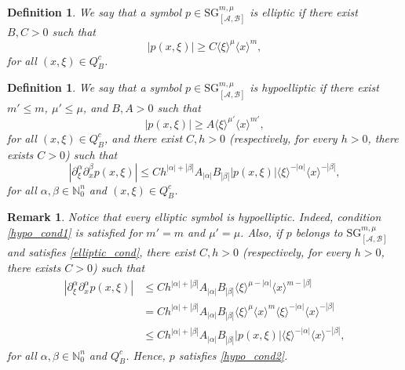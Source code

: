 \documentclass[11pt,reqno]{amsart}
\numberwithin{equation}{section}
\newtheorem{definition}[theorem]{Definition}
\newtheorem{remark}[theorem]{Remark}
\newcommand{\N}{{\mathbb{N}}} %
\newcommand{\SG}{{\mathrm{SG}}}
\newcommand{\A}{{\mathcal{A}}} %
\newcommand{\B}{{\mathcal{B}}} %
\begin{document}
\begin{definition}\label{def_elliptic}
	We say that a symbol $p\in {\SG}_{[\A,\B]}^{m,\mu}$ is elliptic if there exist $B,C>0$ such that
	\begin{equation}\label{elliptic_cond}
		|p(x,\xi)|\geq C\langle\xi\rangle^{\mu}\langle x\rangle^{m},
	\end{equation}
	for all $(x,\xi)\in Q_B^c$.
\end{definition}



\begin{definition}\label{def_hypo}
	We say that a symbol $p\in {\SG}_{[\A,\B]}^{m,\mu}$ is hypoelliptic if there exist $m'\leq m$, $\mu'\leq \mu$, and $B,A>0$ such that
	\begin{equation}\label{hypo_cond1}
		|p(x,\xi)| \geq A\langle\xi\rangle^{\mu'}\langle x\rangle^{m'},
	\end{equation}
	for all $(x,\xi)\in Q_B^c$, and there exist $C,h>0$ (respectively, for every $h>0$, there exists $C>0$) such that
	\begin{equation}\label{hypo_cond2}
		|\partial_\xi^\alpha\partial_x^\beta p(x,\xi)| \leq Ch^{|\alpha|+|\beta|}A_{|\alpha|}B_{|\beta|}|p(x,\xi)|\langle\xi\rangle^{-|\alpha|}\langle x\rangle^{-|\beta|},
	\end{equation}
	for all $\alpha,\beta\in\N_0^n$ and $(x,\xi)\in Q_B^c$.
\end{definition}



\begin{remark}
	Notice that every elliptic symbol is hypoelliptic. Indeed, condition \eqref{hypo_cond1} is satisfied for $m'=m$ and $\mu'=\mu$. 
	Also, if $p$ belongs to ${\SG}_{[\A,\B]}^{m,\mu}$ and satisfies \eqref{elliptic_cond}, there exist $C,h>0$ 
	(respectively, for every $h>0$, there exists $C>0$) such that
	\begin{align*}
		|\partial_\xi^\alpha\partial_x^\alpha p(x,\xi)| & \leq Ch^{|\alpha|+|\beta|}A_{|\alpha|}B_{|\beta|}\langle\xi\rangle^{\mu-|\alpha|}\langle x\rangle^{m-|\beta|}\\
		& = Ch^{|\alpha|+|\beta|}A_{|\alpha|}B_{|\beta|}\langle\xi\rangle^{\mu}\langle x\rangle^{m}\langle\xi\rangle^{-|\alpha|}\langle x\rangle^{-|\beta|}\\
		& \leq Ch^{|\alpha|+|\beta|}A_{|\alpha|}B_{|\beta|}|p(x,\xi)|\langle\xi\rangle^{-|\alpha|}\langle x\rangle^{-|\beta|},
	\end{align*}
	for all $\alpha,\beta\in\N_0^n$ and $Q_B^c$. Hence, $p$ satisfies \eqref{hypo_cond2}.
\end{remark}
\end{document}
